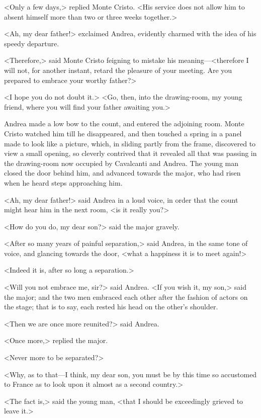  <Only a few days,> replied Monte Cristo. <His service does not allow him to absent himself more than two or three weeks together.> 

 <Ah, my dear father!> exclaimed Andrea, evidently charmed with the idea of his speedy departure. 

 <Therefore,> said Monte Cristo feigning to mistake his meaning—<therefore I will not, for another instant, retard the pleasure of your meeting. Are you prepared to embrace your worthy father?> 

 <I hope you do not doubt it.>  <Go, then, into the drawing-room, my young friend, where you will find your father awaiting you.> 

 Andrea made a low bow to the count, and entered the adjoining room. Monte Cristo watched him till he disappeared, and then touched a spring in a panel made to look like a picture, which, in sliding partly from the frame, discovered to view a small opening, so cleverly contrived that it revealed all that was passing in the drawing-room now occupied by Cavalcanti and Andrea. The young man closed the door behind him, and advanced towards the major, who had risen when he heard steps approaching him. 

 <Ah, my dear father!> said Andrea in a loud voice, in order that the count might hear him in the next room, <is it really you?> 

 <How do you do, my dear son?> said the major gravely. 

 <After so many years of painful separation,> said Andrea, in the same tone of voice, and glancing towards the door, <what a happiness it is to meet again!> 

 <Indeed it is, after so long a separation.> 

 <Will you not embrace me, sir?> said Andrea.  <If you wish it, my son,> said the major; and the two men embraced each other after the fashion of actors on the stage; that is to say, each rested his head on the other's shoulder. 

 <Then we are once more reunited?> said Andrea. 

 <Once more,> replied the major. 

 <Never more to be separated?> 

 <Why, as to that—I think, my dear son, you must be by this time so accustomed to France as to look upon it almost as a second country.> 

 <The fact is,> said the young man, <that I should be exceedingly grieved to leave it.> 


